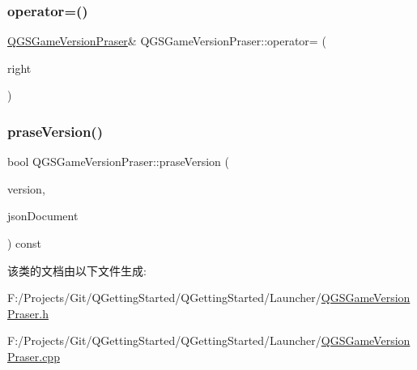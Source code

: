 \mbox{\label{class_q_g_s_game_version_praser_a268ac51f9532bab7707b46caffbbca4d}} 
\subsubsection{\texorpdfstring{operator=()}{operator=()}\hspace{0.1cm}{\footnotesize\ttfamily [2/2]}}
{\footnotesize\ttfamily \mbox{\hyperlink{class_q_g_s_game_version_praser}{Q\+G\+S\+Game\+Version\+Praser}}\& Q\+G\+S\+Game\+Version\+Praser\+::operator= (\begin{DoxyParamCaption}\item[{\mbox{\hyperlink{class_q_g_s_game_version_praser}{Q\+G\+S\+Game\+Version\+Praser}} \&\&}]{right }\end{DoxyParamCaption})\hspace{0.3cm}{\ttfamily [delete]}}

\mbox{\label{class_q_g_s_game_version_praser_a32896aaae8ca4d46ddb21c5119edbbca}} 
\subsubsection{\texorpdfstring{prase\+Version()}{praseVersion()}}
{\footnotesize\ttfamily bool Q\+G\+S\+Game\+Version\+Praser\+::prase\+Version (\begin{DoxyParamCaption}\item[{\mbox{\hyperlink{class_q_g_s_game_version}{Q\+G\+S\+Game\+Version}} \&}]{version,  }\item[{Q\+Json\+Document \&}]{json\+Document }\end{DoxyParamCaption}) const}



该类的文档由以下文件生成\+:\begin{DoxyCompactItemize}
\item 
F\+:/\+Projects/\+Git/\+Q\+Getting\+Started/\+Q\+Getting\+Started/\+Launcher/\mbox{\hyperlink{_q_g_s_game_version_praser_8h}{Q\+G\+S\+Game\+Version\+Praser.\+h}}\item 
F\+:/\+Projects/\+Git/\+Q\+Getting\+Started/\+Q\+Getting\+Started/\+Launcher/\mbox{\hyperlink{_q_g_s_game_version_praser_8cpp}{Q\+G\+S\+Game\+Version\+Praser.\+cpp}}\end{DoxyCompactItemize}
